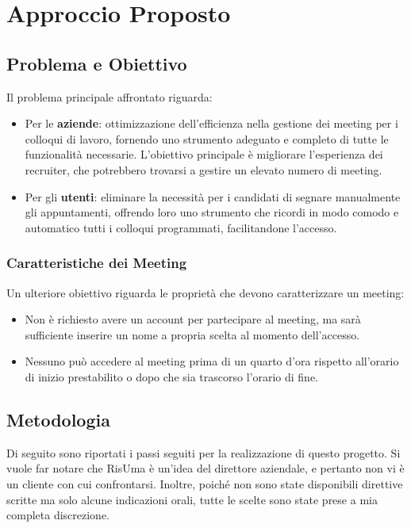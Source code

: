 \chapter{Approccio Proposto}
\section{Problema e Obiettivo}
Il problema principale affrontato riguarda:

\begin{itemize}
   \item Per le \textbf{aziende}: ottimizzazione dell'efficienza nella gestione dei meeting per i colloqui di lavoro, 
   fornendo uno strumento adeguato e completo di tutte le funzionalità necessarie. 
   L'obiettivo principale è migliorare l'esperienza dei recruiter, che potrebbero trovarsi a gestire un elevato numero di meeting.

    \item Per gli \textbf{utenti}: eliminare la necessità per i candidati di segnare manualmente gli appuntamenti, 
    offrendo loro uno strumento che ricordi in modo comodo e automatico tutti i colloqui programmati, facilitandone l'accesso.
 \end{itemize}

   \subsection{Caratteristiche dei Meeting}
   \label{sec:caratteristiche_meeting}
   Un ulteriore obiettivo riguarda le proprietà che devono caratterizzare un meeting:

      \begin{itemize}
         \item Non è richiesto avere un account per partecipare al meeting, ma sarà sufficiente inserire un nome a propria scelta al momento dell'accesso.
         
         \item Nessuno può accedere al meeting prima di un quarto d'ora rispetto all'orario di inizio prestabilito o dopo che sia trascorso l'orario di fine.
      \end{itemize}

\clearpage

\section{Metodologia}
Di seguito sono riportati i passi seguiti per la realizzazione di questo progetto.
Si vuole far notare che RisUma è un'idea del direttore aziendale, 
e pertanto non vi è un cliente con cui confrontarsi. Inoltre, poiché non sono state disponibili direttive scritte ma solo 
alcune indicazioni orali, tutte le scelte sono state prese a mia completa discrezione.

